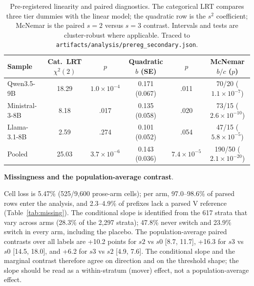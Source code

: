 \documentclass[a4paper,fleqn]{cas-sc}
\begin{document}
\begin{table}[pos=htbp]
  \centering
  \caption{Pre-registered linearity and paired diagnostics. The categorical LRT compares three
  tier dummies with the linear model; the quadratic row is the $s^2$ coefficient; McNemar is the
  paired $s=2$ versus $s=3$ contrast. Intervals and tests are cluster-robust where applicable.
  Traced to \texttt{artifacts/analysis/prereg\_secondary.json}.}
  \label{tab:diagnostics}
  \footnotesize
  \setlength{\tabcolsep}{4pt}
  \begin{tabular}{lccccc}
    \toprule
    \textbf{Sample} & \textbf{Cat.\ LRT $\chi^2(2)$} & \textbf{$p$} & \textbf{Quadratic $b$ (SE)} & \textbf{$p$} & \textbf{McNemar $b/c$ ($p$)} \\
    \midrule
    Qwen3.5-9B     & 18.29 & $1.0\times10^{-4}$ & 0.171 (0.067) & .011 & 70/20 ($1.1\times10^{-7}$) \\
    Ministral-3-8B & 8.18  & .017               & 0.135 (0.058) & .020 & 73/15 ($2.6\times10^{-10}$) \\
    Llama-3.1-8B   & 2.59  & .274               & 0.101 (0.052) & .054 & 47/15 ($5.8\times10^{-5}$) \\
    \midrule
    Pooled         & 25.03 & $3.7\times10^{-6}$ & 0.143 (0.036) & $7.4\times10^{-5}$ & 190/50 ($2.1\times10^{-20}$) \\
    \bottomrule
  \end{tabular}
\end{table}

\noindent\textbf{Missingness and the population-average contrast}.\

Cell loss is 5.47\% (525/9{,}600 prose-arm cells); per arm, 97.0--98.6\% of parsed rows enter the
analysis, and 2.3--4.9\% of prefixes lack a parsed V reference (Table~\ref{tab:missing}). The
conditional slope is identified from the 617 strata that vary across arms (28.3\% of the 2{,}297
strata); 47.8\% never switch and 23.9\% switch in every arm, including the placebo. The
population-average paired contrasts over all labels are +10.2 points for $s2$ vs $s0$
[8.7, 11.7], +16.3 for $s3$ vs $s0$ [14.5, 18.0], and +6.2 for $s3$ vs $s2$ [4.9, 7.6]. The
conditional slope and the marginal contrast therefore agree on direction and on the threshold
shape; the slope should be read as a within-stratum (mover) effect, not a population-average
effect.
\end{document}
